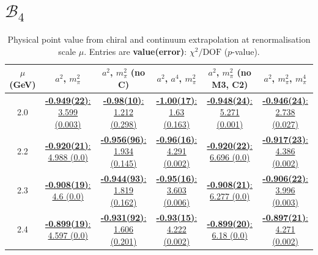 \documentclass[12pt]{extarticle}
\begin{document}
\section{$\mathcal{B}_4$}
\begin{table}[h!]
\begin{center}
\begin{tabular}{|c|c|c|c|c|c|}
\hline
$\mu$ (GeV) & $a^2$, $m_\pi^2$& $a^2$, $m_\pi^2$ (no C)& $a^2$, $a^4$, $m_\pi^2$& $a^2$, $m_\pi^2$ (no M3, C2)& $a^2$, $m_\pi^2$, $m_\pi^4$\\
\hline
2.0& \hyperlink{SSpPP/NPR/a2m2_20.pdf.1}{\textbf{-0.949(22)}: 3.599 (0.003)} & \hyperlink{SSpPP/NPR/a2m2noC_20.pdf.1}{\textbf{-0.98(10)}: 1.212 (0.298)} & \hyperlink{SSpPP/NPR/a2a4m2_20.pdf.1}{\textbf{-1.00(17)}: 1.63 (0.163)} & \hyperlink{SSpPP/NPR/a2m2mcut_20.pdf.1}{\textbf{-0.948(24)}: 5.271 (0.001)} & \hyperlink{SSpPP/NPR/a2m2m4_20.pdf.1}{\textbf{-0.946(24)}: 2.738 (0.027)}\\
2.2& \hyperlink{SSpPP/NPR/a2m2_22.pdf.1}{\textbf{-0.920(21)}: 4.988 (0.0)} & \hyperlink{SSpPP/NPR/a2m2noC_22.pdf.1}{\textbf{-0.956(96)}: 1.934 (0.145)} & \hyperlink{SSpPP/NPR/a2a4m2_22.pdf.1}{\textbf{-0.96(16)}: 4.291 (0.002)} & \hyperlink{SSpPP/NPR/a2m2mcut_22.pdf.1}{\textbf{-0.920(22)}: 6.696 (0.0)} & \hyperlink{SSpPP/NPR/a2m2m4_22.pdf.1}{\textbf{-0.917(23)}: 4.386 (0.002)}\\
2.3& \hyperlink{SSpPP/NPR/a2m2_23.pdf.1}{\textbf{-0.908(19)}: 4.6 (0.0)} & \hyperlink{SSpPP/NPR/a2m2noC_23.pdf.1}{\textbf{-0.944(93)}: 1.819 (0.162)} & \hyperlink{SSpPP/NPR/a2a4m2_23.pdf.1}{\textbf{-0.95(16)}: 3.603 (0.006)} & \hyperlink{SSpPP/NPR/a2m2mcut_23.pdf.1}{\textbf{-0.908(21)}: 6.277 (0.0)} & \hyperlink{SSpPP/NPR/a2m2m4_23.pdf.1}{\textbf{-0.906(22)}: 3.996 (0.003)}\\
2.4& \hyperlink{SSpPP/NPR/a2m2_24.pdf.1}{\textbf{-0.899(19)}: 4.597 (0.0)} & \hyperlink{SSpPP/NPR/a2m2noC_24.pdf.1}{\textbf{-0.931(92)}: 1.606 (0.201)} & \hyperlink{SSpPP/NPR/a2a4m2_24.pdf.1}{\textbf{-0.93(15)}: 4.222 (0.002)} & \hyperlink{SSpPP/NPR/a2m2mcut_24.pdf.1}{\textbf{-0.899(20)}: 6.18 (0.0)} & \hyperlink{SSpPP/NPR/a2m2m4_24.pdf.1}{\textbf{-0.897(21)}: 4.271 (0.002)}\\
\hline
\end{tabular}
\caption{Physical point value from chiral and continuum extrapolation at renormalisation scale $\mu$. Entries are \textbf{value(error)}: $\chi^2/\text{DOF}$ ($p$-value).}
\end{center}
\end{table}
\end{document}
